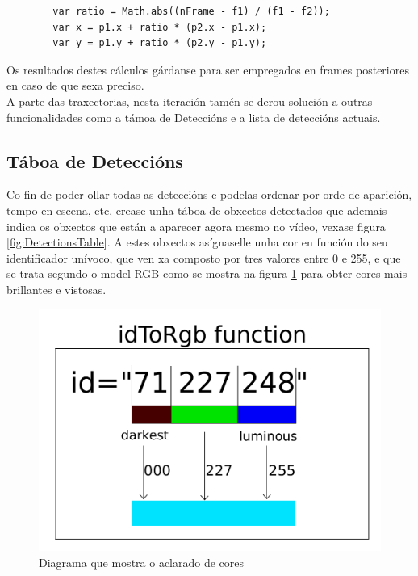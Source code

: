     \begin{verbatim}
        var ratio = Math.abs((nFrame - f1) / (f1 - f2));
        var x = p1.x + ratio * (p2.x - p1.x);
        var y = p1.y + ratio * (p2.y - p1.y);    
    \end{verbatim}
    
    Os resultados destes cálculos gárdanse para ser empregados en frames posteriores en caso de que
    sexa preciso.\\
    
    A parte das traxectorias, nesta iteración tamén se derou solución a outras funcionalidades como
    a támoa de Deteccións e a lista de deteccións actuais.

    \subsection{Táboa de Deteccións}

        Co fin de poder ollar todas as deteccións e podelas ordenar por orde de aparición, tempo en 
        escena, etc, crease unha táboa de obxectos detectados que ademais indica os obxectos que están
        a aparecer agora mesmo no vídeo, vexase figura \ref{fig:DetectionsTable}.
        A estes obxectos asígnaselle unha cor en función do seu 
        identificador unívoco, que ven xa composto por tres valores entre 0 e 255, e que se trata 
        segundo o model RGB como se mostra na figura \ref{fig:lightColor} para obter cores mais 
        brillantes e vistosas.
        
        \begin{figure}[htp]
        \begin{center}
            \includegraphics[scale=0.5]{figures/lightColor.pdf}
            \caption{Diagrama que mostra o aclarado de cores}
        \label{fig:lightColor}
        \end{center}
        \end{figure}

